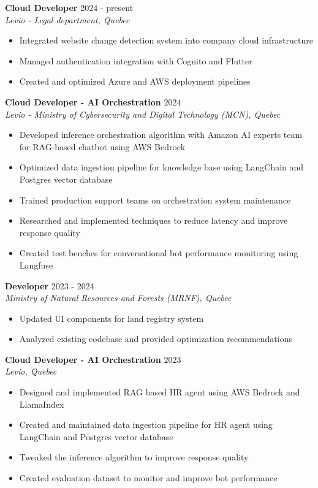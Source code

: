 ﻿\documentclass[11pt,letterpaper]{article}
\begin{document}
\textbf{Cloud Developer} \hfill 2024 - present\\
\textit{Levio - Legal department, Quebec}
\begin{itemize}
\item Integrated website change detection system into company cloud infrastructure
\item Managed authentication integration with Cognito and Flutter
\item Created and optimized Azure and AWS deployment pipelines
\end{itemize}

\textbf{Cloud Developer - AI Orchestration} \hfill 2024\\
\textit{Levio - Ministry of Cybersecurity and Digital Technology (MCN), Quebec}
\begin{itemize}
\item Developed inference orchestration algorithm with Amazon AI experts team for RAG-based chatbot using AWS Bedrock
\item Optimized data ingestion pipeline for knowledge base using LangChain and Postgres vector database
\item Trained production support teams on orchestration system maintenance
\item Researched and implemented techniques to reduce latency and improve response quality
\item Created test benches for conversational bot performance monitoring using Langfuse
\end{itemize}

\textbf{Developer} \hfill 2023 - 2024\\
\textit{Ministry of Natural Resources and Forests (MRNF), Quebec}
\begin{itemize}
\item Updated UI components for land registry system
\item Analyzed existing codebase and provided optimization recommendations
\end{itemize}

\textbf{Cloud Developer - AI Orchestration} \hfill 2023\\
\textit{Levio, Quebec}
\begin{itemize}
\item Designed and implemented RAG based HR agent using AWS Bedrock and LlamaIndex
\item Created and maintained data ingestion pipeline for HR agent using LangChain and Postgres vector database
\item Tweaked the inference algorithm to improve response quality
\item Created evaluation dataset to monitor and improve bot performance
\end{itemize}
\end{document}
